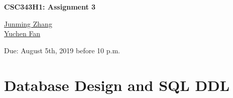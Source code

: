 \documentclass[10pt]{article}
\begin{document}
\begin{center}
\Large \textbf{CSC343H1: Assignment 3}

\vspace{1mm}
\large {\href{mailto:junmingpeter.zhang@mail.utoronto.ca?Subject=CSC343H1: Assignment 3}{Junming Zhang}\\
\href{mailto:yuchen.fan@mail.utoronto.ca?Subject=CSC343: Assignment3}{Yuchen Fan}} 

\vspace{1mm}
\large {Due: August 5th, 2019 before 10 p.m.}
\end{center}

\section*{Database Design and SQL DDL}
\end{document}
